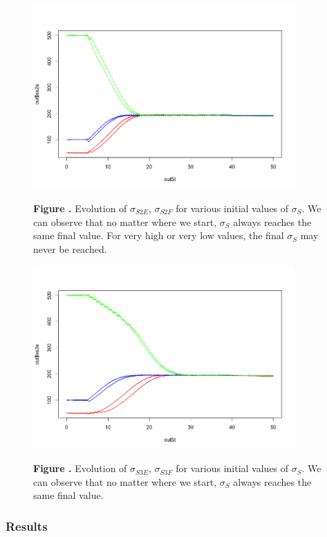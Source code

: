\documentclass{report}
\let\Oldsubsubsection\subsubsection
\renewcommand{\subsubsection}{\FloatBarrier\Oldsubsubsection}
\begin{document}
\begin{figure}[h!]
\begin{center}
\includegraphics[width=10cm]{figures/varying_ss0-ss2.png}
\end{center}
 \textbf{\label{fig:05} Figure . }{Evolution of $\sigma_{S2E}$, $\sigma_{S2F}$  for various initial values of $\sigma_S$. We can observe that no matter where we start, $\sigma_S$ always reaches the same final value. For very high or very low values, the final $\sigma_S$ may never be reached.}
\end{figure}

\begin{figure}[h!]
\begin{center}
\includegraphics[width=10cm]{figures/varying_ss0-ss3.png}
\end{center}
 \textbf{\label{fig:05} Figure . }{Evolution of $\sigma_{S3E}$, $\sigma_{S3F}$  for various initial values of $\sigma_S$. We can observe that no matter where we start, $\sigma_S$ always reaches the same final value.}
\end{figure}

\subsubsection{Results}
\end{document}
